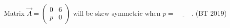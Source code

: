 \item Matrix $\vec{A} = \begin{pmatrix} 0 & 6 \\ p & 0 \end{pmatrix}$ will be skew-symmetric when $p = \underline{\hspace{1cm}}$.
\hfill(BT 2019)

